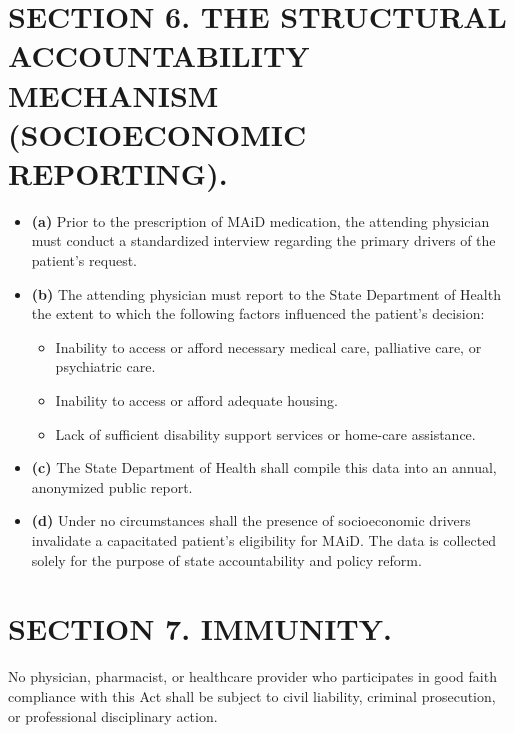 \documentclass[11pt]{article}
\begin{document}
\section*{SECTION 6. THE STRUCTURAL ACCOUNTABILITY MECHANISM (SOCIOECONOMIC REPORTING).}
\begin{itemize}
    \item \textbf{(a)} Prior to the prescription of MAiD medication, the attending physician must conduct a standardized interview regarding the primary drivers of the patient's request.
    \item \textbf{(b)} The attending physician must report to the State Department of Health the extent to which the following factors influenced the patient's decision:
    \begin{itemize}
        \item[(1)] Inability to access or afford necessary medical care, palliative care, or psychiatric care.
        \item[(2)] Inability to access or afford adequate housing.
        \item[(3)] Lack of sufficient disability support services or home-care assistance.
    \end{itemize}
    \item \textbf{(c)} The State Department of Health shall compile this data into an annual, anonymized public report. 
    \item \textbf{(d)} Under no circumstances shall the presence of socioeconomic drivers invalidate a capacitated patient's eligibility for MAiD. The data is collected solely for the purpose of state accountability and policy reform.
\end{itemize}

\section*{SECTION 7. IMMUNITY.}
No physician, pharmacist, or healthcare provider who participates in good faith compliance with this Act shall be subject to civil liability, criminal prosecution, or professional disciplinary action.
\end{document}
